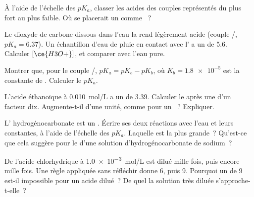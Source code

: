 \begin{exercise}[$\star\star$]\label{exo:g12:ka-and-pka:9}
À l'aide de l'échelle des $pK_a$, classer les acides des couples
représentés du plus fort au plus faible. Où se placerait un 
comme ~?
\end{exercise}

\begin{exercise}[$\star\star$]\label{exo:g12:ka-and-pka:10}
Le dioxyde de carbone dissous dans l'eau la rend légèrement acide
(couple
/, $pK_a = 6.37$). Un échantillon d'eau de pluie en contact avec
l' a un  de 5.6. Calculer $[\ce{H3O+}]$, et comparer avec l'eau
pure.
\end{exercise}

\begin{exercise}[$\star\star$]\label{exo:g12:ka-and-pka:11}
Montrer que, pour le couple /, $pK_a = pK_e - pK_b$, où
$K_b = \num{1.8e-5}$ est la constante de .
Calculer le $pK_a$.
\end{exercise}

\begin{exercise}[$\star\star\star$]\label{exo:g12:ka-and-pka:12}
L'acide éthanoïque à \qty{0.010}{mol/L} a un  de 3.39. Calculer le 
après une  d'un facteur dix. Augmente-t-il d'une unité, comme
pour un ~? Expliquer.
\end{exercise}

\begin{exercise}[$\star\star\star$]\label{exo:g12:ka-and-pka:13}
L' hydrogénocarbonate est un . Écrire ses deux réactions
avec l'eau et leurs constantes, à l'aide de l'échelle des $pK_a$.
Laquelle est la plus grande~? Qu'est-ce que cela suggère pour le 
d'une solution d'hydrogénocarbonate de sodium~?
\end{exercise}

\begin{exercise}[$\star\star\star$]\label{exo:g12:ka-and-pka:14}
De l'acide chlorhydrique à \qty{1.0e-3}{mol/L} est dilué mille fois,
puis encore mille fois. Une règle appliquée sans réfléchir donne  6,
puis  9. Pourquoi un  de 9 est-il impossible pour un acide dilué~?
De quel  la solution très diluée s'approche-t-elle~?
\end{exercise}

